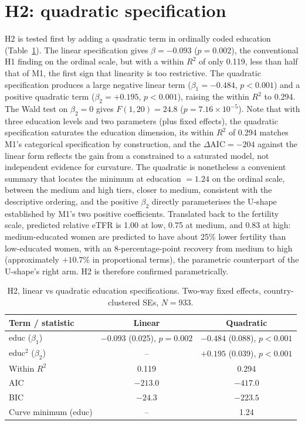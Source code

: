 \documentclass[12pt,a4paper]{report}
\begin{document}
\section{H2: quadratic specification}
H2 is tested first by adding a quadratic term in ordinally coded education
(Table~\ref{tab:quad}). The linear specification gives $\beta=-0.093$ ($p=0.002$), the conventional
H1 finding on the ordinal scale, but with a within $R^2$ of only 0.119, less than half that of M1,
the first sign that linearity is too restrictive. The quadratic specification produces a large
negative linear term ($\beta_1=-0.484$, $p<0.001$) and a positive quadratic term ($\beta_2=+0.195$,
$p<0.001$), raising the within $R^2$ to 0.294. The Wald test on $\beta_2=0$ gives $F(1,20)=24.8$
($p=7.16\times10^{-5}$). Note that with three education levels and two parameters (plus fixed
effects), the quadratic specification saturates the education dimension, its within $R^2$ of 0.294
matches M1's categorical specification by construction, and the $\Delta\mathrm{AIC}=-204$ against the
linear form reflects the gain from a constrained to a saturated model, not independent evidence for
curvature. The quadratic is nonetheless a convenient summary that locates the minimum at education
$=1.24$ on the ordinal scale, between the medium and high tiers, closer to medium, consistent with
the descriptive ordering, and the positive $\beta_2$ directly parameterises the U-shape established
by M1's two positive coefficients. Translated back to the fertility scale, predicted relative eTFR is 1.00 at low, 0.75 at
medium, and 0.83 at high: medium-educated women are predicted to have about 25\% lower fertility than
low-educated women, with an 8-percentage-point recovery from medium to high (approximately
$+10.7\%$ in proportional terms), the parametric counterpart of the U-shape's right arm. H2 is therefore confirmed parametrically.

\begin{table}[ht]
\centering
\caption{H2, linear vs quadratic education specifications. Two-way fixed effects, country-clustered SEs, $N=933$.}
\label{tab:quad}
\begin{tabular}{@{}lcc@{}}
\toprule
Term / statistic & Linear & Quadratic \\
\midrule
educ ($\beta_1$)   & $-0.093$ (0.025), $p=0.002$ & $-0.484$ (0.088), $p<0.001$ \\
educ$^2$ ($\beta_2$) & -- & $+0.195$ (0.039), $p<0.001$ \\
Within $R^2$ & 0.119 & 0.294 \\
AIC & $-213.0$ & $-417.0$ \\
BIC & $-24.3$ & $-223.5$ \\
Curve minimum (educ) & -- & 1.24 \\
\bottomrule
\end{tabular}
\end{table}
\end{document}
